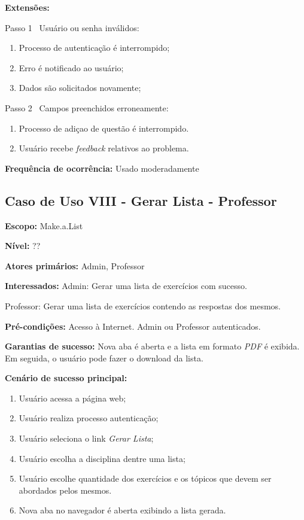 \documentclass[12pt,oneside,a4paper,article]{abntex2}
\begin{document}
		\textbf{Extensões:} 
		
		Passo 1 \textrightarrow \ Usuário ou senha inválidos:
		
		\begin{enumerate}[label=\alph*.]	
			\item Processo de autenticação é interrompido;
			\item Erro é notificado ao usuário;
			\item Dados são solicitados novamente;
		\end{enumerate}
		
		Passo 2 \textrightarrow \ Campos preenchidos erroneamente:
		
		\begin{enumerate}[label=\alph*.]	
			\item Processo de adiçao de questão é interrompido.
			\item Usuário recebe \textit{feedback} relativos ao problema.	
		\end{enumerate}
		
		\textbf{Frequência de ocorrência:} Usado moderadamente
	
		\subsection{Caso de Uso VIII - Gerar Lista - Professor}
		
			\textbf{Escopo:} Make.a.List 
			
			\textbf{Nível:} ??
			
			\textbf{Atores primários:} Admin, Professor
			
			\textbf{Interessados:} Admin: Gerar uma lista de exercícios com sucesso.
			
			Professor: Gerar uma lista de exercícios contendo as respostas dos mesmos.
			
			\textbf{Pré-condições:} Acesso à Internet. Admin ou Professor autenticados.
			
			\textbf{Garantias de sucesso:} Nova aba é aberta e a lista em formato \textit{PDF} é exibida. Em seguida, o usuário pode fazer o download da lista.
			
			\textbf{Cenário de sucesso principal:} 
			
			\begin{enumerate}
				\item Usuário acessa a página web;
				
				\item Usuário realiza processo autenticação;
				
				\item Usuário seleciona o link \textit{Gerar Lista};
				
				\item Usuário escolha a disciplina dentre uma lista;
				
				\item Usuário escolhe quantidade dos exercícios e os tópicos que devem ser abordados pelos mesmos.	
				
				\item Nova aba no navegador é aberta exibindo a lista gerada.
				
			\end{enumerate}
			
\end{document}
